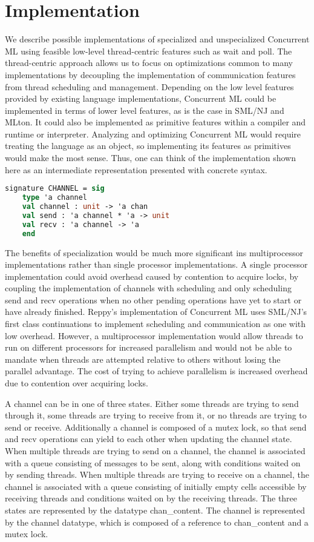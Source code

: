 \documentclass{article}
\begin{document}
\section{Implementation}
We describe possible implementations of specialized and unspecialized Concurrent ML using
feasible low-level thread-centric features such as wait and poll.  The thread-centric approach
allows us to focus on optimizations common to many implementations by decoupling the
implementation of communication features from thread scheduling and management.  Depending on
the low level features provided by existing language implementations, Concurrent ML could be
implemented in terms of lower level features, as is the case in SML/NJ and MLton.  It could
also be implemented as primitive features within a compiler and runtime or interpreter.
Analyzing and optimizing Concurrent ML would require treating the language as an object, so
implementing its features as primitives would make the most sense.  Thus, one can think of the
implementation shown here as an intermediate representation presented with concrete syntax.

\begin{lstlisting}[language=ML, escapechar=\%]
  signature CHANNEL = sig
    type 'a channel 
    val channel : unit -> 'a chan
    val send : 'a channel * 'a -> unit
    val recv : 'a channel -> 'a
    end     
\end{lstlisting}


The benefits of specialization would be much more significant ins multiprocessor
implementations rather than single processor implementations.  A single processor
implementation could avoid overhead caused by contention to acquire locks, by coupling the
implementation of channels with scheduling and only scheduling send and recv operations when no
other pending operations have yet to start or have already finished.  Reppy's implementation of
Concurrent ML uses SML/NJ's first class continuations to implement scheduling and communication
as one with low overhead.  However, a multiprocessor implementation would allow threads to run
on different processors for increased parallelism and would not be able to mandate when threads
are attempted relative to others without losing the parallel advantage.  The cost of trying to
achieve parallelism is increased overhead due to contention over acquiring locks.

A channel can be in one of three states.  Either some threads are trying to send through it,
some threads are trying to receive from it, or no threads are trying to send or receive.
Additionally a channel is composed of a mutex lock, so that send and recv operations can yield
to each other when updating the channel state.  When multiple threads are trying to send on a
channel, the channel is associated with a queue consisting of messages to be sent, along with
conditions waited on by sending threads. When multiple threads are trying to receive on a
channel, the channel is associated with a queue consisting of initially empty cells accessible
by receiving threads and conditions waited on by the receiving threads. The three states are
represented by the datatype chan\_content.  The channel is represented by the channel datatype,
which is composed of a reference to chan\_content and a mutex lock.  
\end{document}

